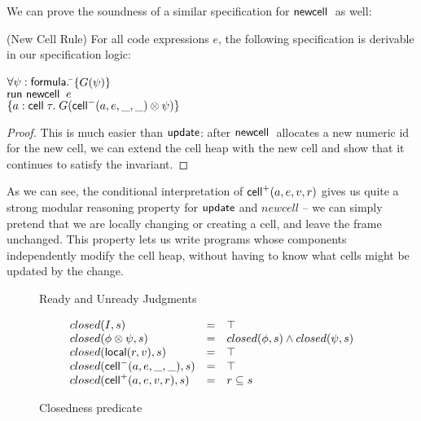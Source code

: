 \documentclass[preprint,natbib]{sigplanconf}
\begin{document}
We can prove the soundness of a similar specification for $\mbox{\textsf{{newcell}}}\;$ as
well:

\begin{prop}{(New Cell Rule)}
For all code expressions $e$, the following specification is derivable in
our specification logic: 
\begin{tabbing}
$\forall \psi:\mbox{\textsf{{formula}}}.\; $\=$\{{G(\psi)}\}$ \\
                           \>$\mbox{\textsf{{run }}}{\mbox{\textsf{{newcell}}}\;\;e}$ \\
                           \>$\{{a:\mbox{\textsf{{cell}}}\;{\tau}.\; G(\mbox{\textsf{{cell}}}^{-}({a}, {e}, {\_}, {\_}) \otimes \psi)}\}$
\end{tabbing}
\end{prop}

\begin{proof}
This is much easier than $\mbox{\textsf{{update}}}$: after $\mbox{\textsf{{newcell}}}\;$ allocates a new
numeric id for the new cell, we can extend the cell heap with the new 
cell and show that it continues to satisfy the invariant. 
\end{proof}

As we can see, the conditional interpretation of $\mbox{\textsf{{cell}}}^{+}({a}, {e}, {v}, {r})$
gives us quite a strong modular reasoning property for $\mbox{\textsf{{update}}}$ and
$newcell$ -- we can simply pretend that we are locally changing or
creating a cell, and leave the frame unchanged. This property lets us write 
programs whose components independently modify the cell heap, without
having to know what cells might be updated by the change. 

\begin{figure}
{\small
{}
}
\caption{Ready and Unready Judgments}
\label{readiness}
\end{figure}

\begin{figure}
{\small
  \begin{displaymath}
    \begin{array}{lcl}
      closed(I, s) & = & \top \\
      closed(\phi \otimes \psi, s) & = & closed(\phi, s) \land closed(\psi, s) \\ 
      closed(\mbox{\textsf{{local}}}({r}, {v}), s) & = & \top \\
      closed(\mbox{\textsf{{cell}}}^{-}({a}, {e}, {\_}, {\_}), s) & = & \top \\
      closed(\mbox{\textsf{{cell}}}^{+}({a}, {e}, {v}, {r}), s) & = & r \subseteq s \\
    \end{array}
  \end{displaymath}
}
\caption{Closedness predicate}
\label{closedness}  
\end{figure}
\end{document}
